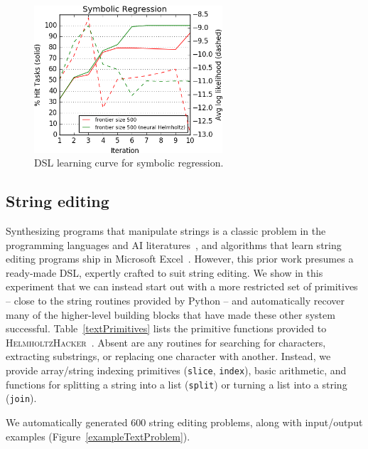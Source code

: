 \documentclass{article}
\newcommand{\system}{\textsc{HelmholtzHacker}~}
\begin{document}
\begin{figure}\centering
  \includegraphics[width = 7cm]{figures/symbolicRegression.png}
  \caption{DSL learning curve for symbolic regression.}\label{regressionLearningCurve}
\end{figure}

\subsection{String editing}\label{textSection}
Synthesizing programs that manipulate strings is a classic problem in the
programming languages and AI literatures~\cite{menon2013machine,lau2001programming},
and algorithms that learn string editing programs ship in Microsoft Excel~\cite{gulwani2011automating}.
However, this prior work presumes a ready-made DSL,
expertly crafted to suit string editing.
We show in this experiment that we can instead start out with a
more restricted set of primitives -- close to the string routines provided by Python --
and automatically recover many of the higher-level building blocks that have made these
other system successful.
Table~\ref{textPrimitives} lists the primitive functions provided to \system.
Absent are any routines for searching for characters, extracting substrings,
or replacing one character with another.
Instead, we provide array/string indexing primitives (\texttt{slice}, \texttt{index}),
basic arithmetic, and functions for splitting a string into a list (\texttt{split})
or turning a list into a string (\texttt{join}).

We automatically generated 600 string editing problems,
along with input/output examples (Figure~\ref{exampleTextProblem}).
\end{document}
